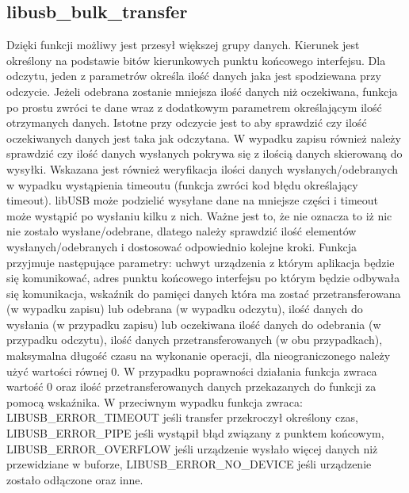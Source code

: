 \documentclass{BscUS}
\begin{document}
\subsection{libusb\_bulk\_transfer}
Dzięki funkcji możliwy jest przesył większej grupy danych.
\newline
Kierunek jest określony na podstawie bitów kierunkowych punktu końcowego interfejsu.
\newline
Dla odczytu, jeden z parametrów określa ilość danych jaka jest spodziewana przy odczycie. Jeżeli odebrana zostanie mniejsza ilość danych niż oczekiwana, funkcja po prostu zwróci te dane wraz z dodatkowym parametrem określającym ilość otrzymanych danych. Istotne przy odczycie jest to aby sprawdzić czy ilość oczekiwanych danych jest taka jak odczytana.
\newline
W wypadku zapisu również należy sprawdzić czy ilość danych wysłanych pokrywa się z ilością danych skierowaną do wysyłki.
\newline
Wskazana jest również weryfikacja ilości danych wysłanych/odebranych w wypadku wystąpienia timeoutu (funkcja zwróci kod błędu określający timeout). libUSB może podzielić wysyłane dane na mniejsze części i timeout może wystąpić po wysłaniu kilku z nich. Ważne jest to, że nie oznacza to iż nic nie zostało wysłane/odebrane, dlatego należy sprawdzić ilość elementów wysłanych/odebranych i dostosować odpowiednio kolejne kroki.
\newline
Funkcja przyjmuje następujące parametry: uchwyt urządzenia z którym aplikacja będzie się komunikować, adres punktu końcowego interfejsu po którym będzie odbywała się komunikacja, wskaźnik do pamięci danych która ma zostać przetransferowana (w wypadku zapisu) lub odebrana (w wypadku odczytu), ilość danych do wysłania (w przypadku zapisu) lub oczekiwana ilość danych do odebrania (w przypadku odczytu), ilość danych przetransferowanych (w obu przypadkach), maksymalna długość czasu na wykonanie operacji, dla nieograniczonego należy użyć wartości równej 0.
\newline
W przypadku poprawności działania funkcja zwraca wartość 0 oraz ilość przetransferowanych danych przekazanych do funkcji za pomocą wskaźnika.
\newline
W przeciwnym wypadku funkcja zwraca: LIBUSB\_ERROR\_TIMEOUT jeśli transfer przekroczył określony czas, LIBUSB\_ERROR\_PIPE jeśli wystąpił błąd związany z punktem końcowym, LIBUSB\_ERROR\_OVERFLOW jeśli urządzenie wysłało więcej danych niż przewidziane w buforze, LIBUSB\_ERROR\_NO\_DEVICE jeśli urządzenie zostało odłączone oraz inne.
\end{document}
